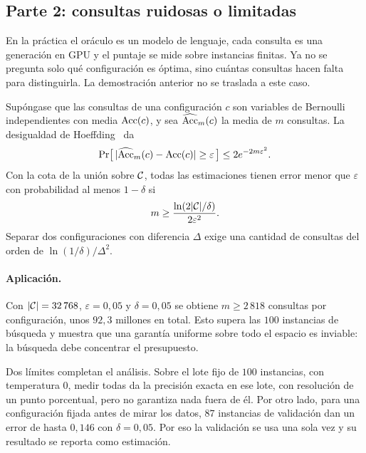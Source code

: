 \subsection{Parte 2: consultas ruidosas o limitadas}

En la práctica el oráculo es un modelo de lenguaje, cada consulta es una generación en
GPU y el puntaje se mide sobre instancias finitas. Ya no se pregunta solo qué configuración
es óptima, sino cuántas consultas hacen falta para distinguirla. La demostración anterior
no se traslada a este caso.

Supóngase que las consultas de una configuración $c$ son variables de Bernoulli
independientes con media $\operatorname{Acc}(c)$, y sea $\widehat{\operatorname{Acc}}_m(c)$ la media de $m$ consultas.
La desigualdad de Hoeffding~\cite{hoeffding1963} da
\[
  \Pr\bigl[\,|\widehat{\operatorname{Acc}}_m(c)-\operatorname{Acc}(c)|\ge\varepsilon\,\bigr]\le 2e^{-2m\varepsilon^2}.
\]
Con la cota de la unión sobre $\mathcal{C}$, todas las estimaciones tienen error menor que
$\varepsilon$ con probabilidad al menos $1-\delta$ si
\[
  m\ge\frac{\ln(2|\mathcal{C}|/\delta)}{2\varepsilon^2}.
\]
Separar dos configuraciones con diferencia $\Delta$ exige una cantidad de consultas del
orden de $\ln(1/\delta)/\Delta^2$.

\paragraph{Aplicación.} Con $|\mathcal{C}|=32\,768$, $\varepsilon=0{,}05$ y $\delta=0{,}05$ se
obtiene $m\ge 2\,818$ consultas por configuración, unos $92{,}3$ millones en total. Esto
supera las $100$ instancias de búsqueda y muestra que una garantía uniforme sobre todo el
espacio es inviable: la búsqueda debe concentrar el presupuesto.

Dos límites completan el análisis. Sobre el lote fijo de $100$ instancias, con temperatura
$0$, medir todas da la precisión exacta en ese lote, con resolución de un punto porcentual, pero no
garantiza nada fuera de él. Por otro lado, para una configuración fijada antes de mirar los
datos, $87$ instancias de validación dan un error de hasta $0{,}146$ con $\delta=0{,}05$.
Por eso la validación se usa una sola vez y su resultado se reporta como estimación.
